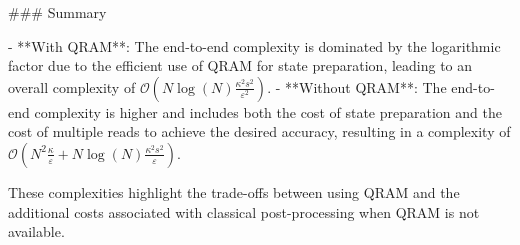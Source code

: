### Summary

- **With QRAM**: The end-to-end complexity is dominated by the logarithmic factor due to the efficient use of QRAM for state preparation, leading to an overall complexity of \( \mathcal{O}(N \log(N) \frac{\kappa^2 s^2}{\varepsilon^2}) \).
- **Without QRAM**: The end-to-end complexity is higher and includes both the cost of state preparation and the cost of multiple reads to achieve the desired accuracy, resulting in a complexity of \( \mathcal{O}(N^2 \frac{\kappa}{\varepsilon} + N \log(N) \frac{\kappa^2 s^2}{\varepsilon}) \).

These complexities highlight the trade-offs between using QRAM and the additional costs associated with classical post-processing when QRAM is not available.